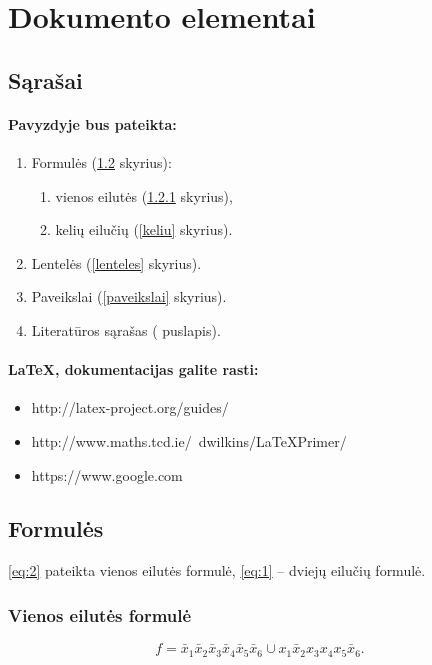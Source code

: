 \documentclass[12pt]{article}
\begin{document}
		

\tableofcontents

\newpage


\section{Dokumento elementai}

\subsection{Sąrašai}

\paragraph{Pavyzdyje bus pateikta:}	
\begin{enumerate}
	\item Formulės (\ref{formules} skyrius):
	\begin{enumerate}
		\item vienos eilutės (\ref{vienos} skyrius),
		\item kelių eilučių  (\ref{keliu} skyrius).
	\end{enumerate}
	\item Lentelės (\ref{lenteles} skyrius).
	\item Paveikslai (\ref{paveikslai} skyrius).
	\item Literatūros sąrašas (\pageref{literatura} puslapis).
\end{enumerate}

\paragraph{LaTeX, dokumentacijas galite rasti:}
\begin{itemize}
	\item http://latex-project.org/guides/
	\item http://www.maths.tcd.ie/~dwilkins/LaTeXPrimer/
	\item https://www.google.com
\end{itemize}

\subsection{Formulės} \label{formules}
\eqref{eq:2} pateikta vienos eilutės formulė, \eqref{eq:1} -- dviejų eilučių formulė.

\subsubsection{Vienos eilutės formulė} \label{vienos}
\begin{equation}
	f = \bar{x}_{1}\bar{x}_{2}\bar{x}_{3}\bar{x}_{4}\bar{x}_{5}\bar{x}_{6}\cup x_{1}\bar{x}_{2} x_{3} x_{4} x_{5}\bar{x}_{6}. \label{eq:2}
\end{equation}
\end{document}
